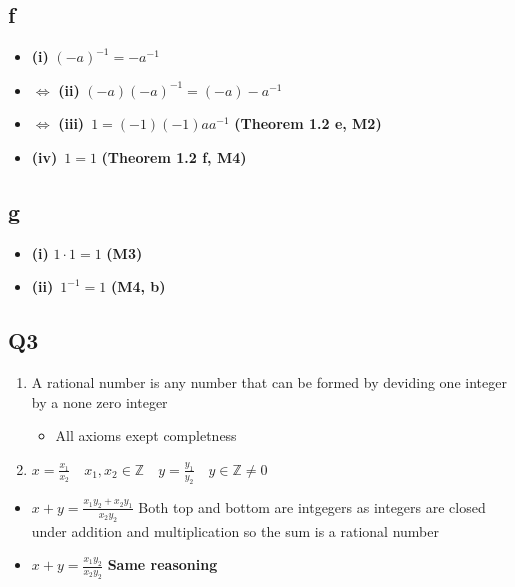 \documentclass[]{article}
\providecommand{\tightlist}{%
  \setlength{\itemsep}{0pt}\setlength{\parskip}{0pt}}
\begin{document}
\hypertarget{f-1}{%
\subsection{f}\label{f-1}}

\begin{itemize}
\tightlist
\item
  \textbf{(i)} \((-a)^{-1} = -a^{-1}\)
\item
  \(\iff\) \textbf{(ii)} \((-a)(-a)^{-1} = (-a)-a^{-1}\)
\item
  \(\iff\) \textbf{(iii)} \(\, 1 = (-1) (-1) a a^{-1}\) \textbf{(Theorem
  1.2 e, M2)}
\item
  \textbf{(iv)} \(\,1 = 1\) \textbf{(Theorem 1.2 f, M4)}
\end{itemize}

\hypertarget{g}{%
\subsection{g}\label{g}}

\begin{itemize}
\tightlist
\item
  \textbf{(i)} \(1 \cdot 1 = 1\) \textbf{(M3)}
\item
  \textbf{(ii)} \(\,1^{-1} =1\) \textbf{(M4, b)}
\end{itemize}

\hypertarget{q3}{%
\subsection{Q3}\label{q3}}

\begin{enumerate}
\tightlist
\item
  A rational number is any number that can be formed by deviding one
  integer by a none zero integer

  \begin{itemize}
  \tightlist
  \item
    All axioms exept completness
  \end{itemize}
\item
  \(x = \frac{x_1}{x_2} \quad x_1,x_2 \in \mathbb{Z} \quad y = \frac{y_1}{y_2} \quad y \in \mathbb{Z} \neq0\)
\end{enumerate}

\begin{itemize}
\tightlist
\item
  \(x + y = \frac{x_1y_2 + x_2y_1}{x_2y_2}\) Both top and bottom are
  intgegers as integers are closed under addition and multiplication so
  the sum is a rational number
\item
  \(x + y = \frac{x_1y_2}{x_2y_2}\) \textbf{Same reasoning}
\end{itemize}
\end{document}
